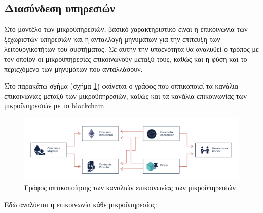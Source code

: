 \subsection{Διασύνδεση υπηρεσιών} \label{subsection:4-3-8-service-communication}

Στο μοντέλο των μικροϋπηρεσιών, βασικό χαρακτηριστικό είναι η επικοινωνία των ξεχωριστών υπηρεσιών και η ανταλλαγή μηνυμάτων για την επίτευξη των λειτουργικοτήτων του συστήματος. Σε αυτήν την υποενότητα θα αναλυθεί ο τρόπος με τον οποίον οι μικροϋπηρεσίες επικοινωνούν μεταξύ τους, καθώς και η φύση και το περιεχόμενο των μηνυμάτων που ανταλλάσουν.

Στο παρακάτω σχήμα (σχήμα \ref{figure:4-3-communications-graph}) φαίνεται ο γράφος που οπτικοποιεί τα κανάλια επικοινωνίας μεταξύ των μικροϋπηρεσιών, καθώς και τα κανάλια επικοινωνίας των μικροϋπηρεσιών με το blockchain.

\begin{figure}[H]
    \centering
    \includegraphics[width=\textwidth]{assets/figures/chapter-4/4.3.communications-diagram.png}
    \caption{Γράφος οπτικοποίησης των καναλιών επικοινωνίας των μικροϋπηρεσιών}
    \label{figure:4-3-communications-graph}
\end{figure}

Εδώ αναλύεται η επικοινωνία κάθε μικροϋπηρεσίας:

